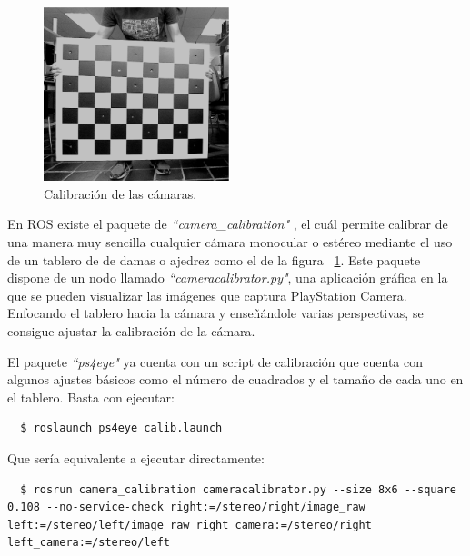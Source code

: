 \begin{figure}
  \vspace{-20pt}
  \begin{center}
    \includegraphics[width=0.48\textwidth]{images/cap4/Calibracion.eps}
  \end{center}
  \vspace{-20pt}
  \caption{Calibración de las cámaras.}
  \vspace{-10pt}
  \label{fig:Calibracion}
\end{figure}

En ROS existe el paquete de \textit{``camera\_calibration"}
\cite{PackageCalibration}, el cuál permite calibrar de una manera muy sencilla
cualquier cámara monocular o estéreo mediante el uso de un tablero de de damas o
ajedrez como el de la figura ~\ref{fig:Calibracion}. Este paquete dispone de un
nodo llamado \textit{``cameracalibrator.py"}, una aplicación gráfica en la que
se pueden visualizar las imágenes que captura PlayStation Camera. Enfocando el
tablero hacia la cámara y enseñándole varias perspectivas, se consigue ajustar
la calibración de la cámara.

El paquete \textit{``ps4eye"} ya cuenta con un script de calibración que cuenta
con algunos ajustes básicos como el número de cuadrados y el tamaño de cada uno
en el tablero. Basta con ejecutar:
\\
\begin{lstlisting}
  $ roslaunch ps4eye calib.launch 
\end{lstlisting}

Que sería equivalente a ejecutar directamente:

\begin{lstlisting}
  $ rosrun camera_calibration cameracalibrator.py --size 8x6 --square 0.108 --no-service-check right:=/stereo/right/image_raw left:=/stereo/left/image_raw right_camera:=/stereo/right left_camera:=/stereo/left
\end{lstlisting}

